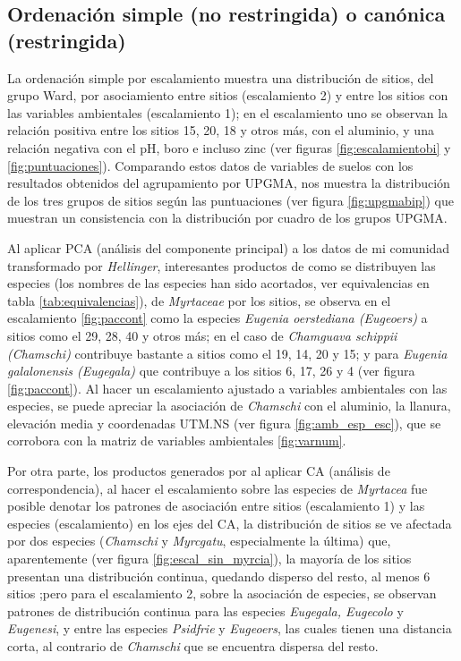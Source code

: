 \documentclass[11pt,]{article}
\begin{document}
\subsection{Ordenación simple (no restringida) o canónica
(restringida)}\label{ordenaciuxf3n-simple-no-restringida-o-canuxf3nica-restringida}

La ordenación simple por escalamiento muestra una distribución de
sitios, del grupo Ward, por asociamiento entre sitios (escalamiento 2) y
entre los sitios con las variables ambientales (escalamiento 1); en el
escalamiento uno se observan la relación positiva entre los sitios 15,
20, 18 y otros más, con el aluminio, y una relación negativa con el pH,
boro e incluso zinc (ver figuras \ref{fig:escalamientobi} y
\ref{fig:puntuaciones}). Comparando estos datos de variables de suelos
con los resultados obtenidos del agrupamiento por UPGMA, nos muestra la
distribución de los tres grupos de sitios según las puntuaciones (ver
figura \ref{fig:upgmabip}) que muestran un consistencia con la
distribución por cuadro de los grupos UPGMA.

Al aplicar PCA (análisis del componente principal) a los datos de mi
comunidad transformado por \emph{Hellinger}, interesantes productos de
como se distribuyen las especies (los nombres de las especies han sido
acortados, ver equivalencias en tabla \ref{tab:equivalencias}), de
\emph{Myrtaceae} por los sitios, se observa en el escalamiento
\ref{fig:paccont} como la especies \emph{Eugenia oerstediana (Eugeoers)}
a sitios como el 29, 28, 40 y otros más; en el caso de \emph{Chamguava
schippii (Chamschi)} contribuye bastante a sitios como el 19, 14, 20 y
15; y para \emph{Eugenia galalonensis (Eugegala)} que contribuye a los
sitios 6, 17, 26 y 4 (ver figura \ref {fig:paccont}). Al hacer un
escalamiento ajustado a variables ambientales con las especies, se puede
apreciar la asociación de \emph{Chamschi} con el aluminio, la llanura,
elevación media y coordenadas UTM.NS (ver figura \ref{fig:amb_esp_esc}),
que se corrobora con la matriz de variables ambientales
\ref {fig:varnum}.

Por otra parte, los productos generados por al aplicar CA (análisis de
correspondencia), al hacer el escalamiento sobre las especies de
\emph{Myrtacea} fue posible denotar los patrones de asociación entre
sitios (escalamiento 1) y las especies (escalamiento) en los ejes del
CA, la distribución de sitios se ve afectada por dos especies
(\emph{Chamschi} y \emph{Myrcgatu}, especialmente la última) que,
aparentemente (ver figura \ref{fig:escal_sin_myrcia}), la mayoría de los
sitios presentan una distribución continua, quedando disperso del resto,
al menos 6 sitios ;pero para el escalamiento 2, sobre la asociación de
especies, se observan patrones de distribución continua para las
especies \emph{Eugegala, Eugecolo} y \emph{Eugenesi}, y entre las
especies \emph{Psidfrie} y \emph{Eugeoers}, las cuales tienen una
distancia corta, al contrario de \emph{Chamschi} que se encuentra
dispersa del resto.
\end{document}
